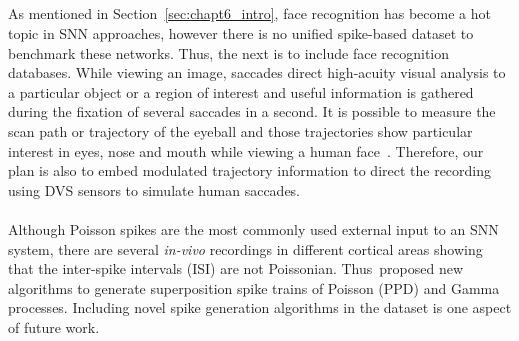 \subsection{}

\paragraph{}
\DIFaddend As mentioned in Section~\ref{sec:chapt6_intro}, face recognition has become a hot topic in SNN approaches, however there is no unified spike-based dataset to benchmark these networks.
Thus, the next \DIFdelbegin {}\DIFdelend \DIFaddbegin {}\DIFaddend is to include face recognition databases.
While viewing an image, saccades direct high-acuity visual analysis to a particular object or a region of interest and useful information is gathered during the fixation of several saccades in a second.
It is possible to measure the scan path or trajectory of the eyeball and those trajectories show particular interest in eyes, nose and mouth while viewing a human face~\citep{yarbus1967eye}.
Therefore, our plan is also to embed modulated trajectory information to direct the recording using DVS sensors to simulate human saccades.

\DIFdelbegin {}\DIFdelend \DIFaddbegin \paragraph{}
\DIFaddend Although Poisson spikes are the most commonly used external input to an SNN system, there are several \textit{in-vivo} recordings in different cortical areas showing that the inter-spike intervals (ISI) are not Poissonian\DIFdelbegin {}\DIFdelend . 
Thus~\DIFdelbegin {}\DIFdelend \DIFaddbegin {}\DIFaddend proposed new algorithms to generate superposition spike trains of Poisson \DIFdelbegin {}\DIFdelend \DIFaddbegin {}\DIFaddend (PPD) and \DIFdelbegin {}\DIFdelend Gamma processes.
Including novel spike generation algorithms in the dataset is one aspect of future work\DIFdelbegin {}\DIFdelend .

